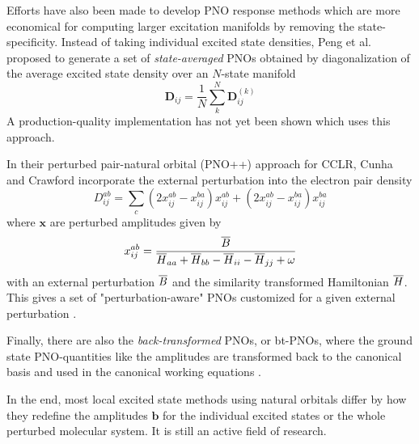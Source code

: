 Efforts have also been made to develop PNO response methods which are more economical for computing larger excitation manifolds by removing the state-specificity. Instead of taking individual excited state densities, Peng et al. \cite{Pen2018} proposed to generate a set of \emph{state-averaged} PNOs obtained by diagonalization of the average excited state density over an $N$-state manifold 
\begin{equation}
\mathbf{D}_{ij} = \frac{1}{N} \sum_k^N \mathbf{D}_{ij}^{(k)}
\end{equation}
\noindent A production-quality implementation has not yet been shown which uses this approach.

In their perturbed pair-natural orbital (PNO++) approach for CCLR, Cunha and Crawford \cite{DCu2021} incorporate the external perturbation into the electron pair density
\begin{equation}
D_{ij}^{ab} = \sum_c \left( 2x_{ij}^{ab} - x_{ij}^{ba} \right) x_{ij}^{ab} + \left( 2x_{ij}^{ab} - x_{ij}^{ba} \right) x_{ij}^{ba}
\end{equation}
\noindent where $\mathbf{x}$ are perturbed amplitudes given by
\begin{equation}
x_{ij}^{ab} = \frac{\overline{B}}{\overline{H}_{aa} + \overline{H}_{bb} - \overline{H}_{ii} - \overline{H}_{jj} + \omega}
\end{equation}
\noindent with an external perturbation $\overline{B}$ and the similarity transformed Hamiltonian $\overline{H}$. This gives a set of "perturbation-aware" PNOs customized for a given external perturbation \cite{Cra2019}. 

Finally, there are also the \emph{back-transformed} PNOs, or bt-PNOs, where the ground state PNO-quantities like the amplitudes are transformed back to the canonical basis and used in the canonical working equations \cite{Dut2016}.

In the end, most local excited state methods using natural orbitals differ by how they redefine the amplitudes $\mathbf{b}$ for the individual excited states or the whole perturbed molecular system. It is still an active field of research.


